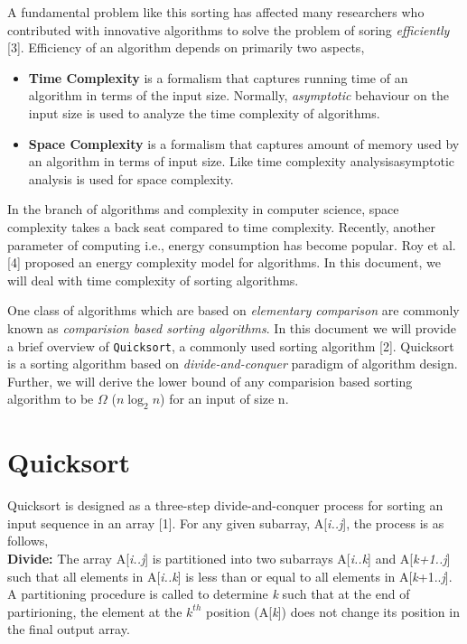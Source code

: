 \documentclass[a4paper,10pt,twocolumn]{article}
\begin{document}
A fundamental problem like this sorting has affected many researchers who contributed with innovative algorithms to solve the problem of soring \textit{efficiently} [3]. Efficiency of an algorithm depends on primarily two aspects,
\begin{itemize}
    \item \textbf{Time Complexity} is a formalism that captures running time of an algorithm in terms of the input size. Normally, \textit{asymptotic} behaviour on the input size is used to analyze the time complexity of algorithms.
    \item \textbf{Space Complexity} is a formalism that captures amount of memory used by an algorithm in terms of input size. Like time complexity analysisasymptotic analysis is used for space complexity.
\end{itemize}
In the branch of algorithms and complexity in computer science, space complexity takes a back seat
compared to time complexity. Recently, another parameter of computing i.e., energy consumption
has become popular. Roy et al. [4] proposed an energy complexity model for algorithms. In this document, we will deal with time complexity of sorting algorithms.

One class of algorithms which are based on \textit{elementary comparison} are commonly known as \textit{comparision based sorting algorithms}. In this document we will provide a brief overview of \texttt{Quicksort}, a commonly used sorting algorithm [2]. Quicksort is a sorting algorithm based on \textit{divide-and-conquer} paradigm of algorithm design. Further, we will derive the lower bound of any comparision based sorting algorithm to be $\Omega$ ($n\log_2 n$) for an input of size n.
\section{Quicksort}
Quicksort is designed as a three-step divide-and-conquer process for sorting an input sequence in an array [1]. For any given subarray, A[\textit{i..j}], the process is as follows,\\
\textbf{Divide:} The array A[\textit{i..j}] is partitioned into two subarrays A[\textit{i..k}] and A[\textit{k+1..j}] such that all elements in A[\textit{i..k}] is less than or equal to all elements in A[\textit{k}+1..{\it j}]. A partitioning procedure is called to determine {\it k} such that at the end of partirioning, the element at the $k^{th}$ position (A[{\it k}]) does not change its position in the final output array. 
\end{document}

